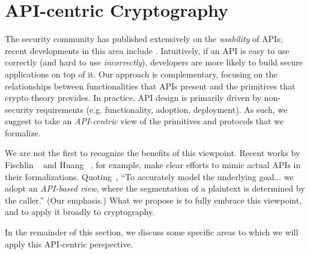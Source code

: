 \section{API-centric Cryptography}
The security community has published extensively on the \emph{usability} of
APIs; recent developments in this area include \cite{ABF+,HHL+17,IKND16}.
Intuitively, if an API is easy to use correctly (and hard to use
\emph{incorrectly}), developers are more likely to build secure applications on
top of it.
%
Our approach is complementary, focusing on the relationships between
functionalities that APIs present and the primitives that crypto theory
provides. In practice, API design is primarily driven by non-security
requirements (e.g. functionality, adoption, deployment).
%
As such, we suggest to take an
\emph{API-centric} view of the primitives and protocols that we
formalize.

We are not the first to recognize the benefits of this viewpoint.
Recent works by Fischlin \etal~\cite{FPMG15} and Huang
\etal~\cite{HRRV15}, for example, make clear efforts to mimic actual
APIs in their formalizations.  Quoting~\cite{HRRV15}, ``To
accurately model the underlying goal... we adopt an \emph{API-based
  view}, where the segmentation of a plaintext is determined by the
caller.'' (Our emphasis.)  What we propose is to fully embrace this
viewpoint, and to apply it broadly to cryptography.

In the remainder of this section, we discuss some specific areas to which we will apply
this API-centric perspective.
%



